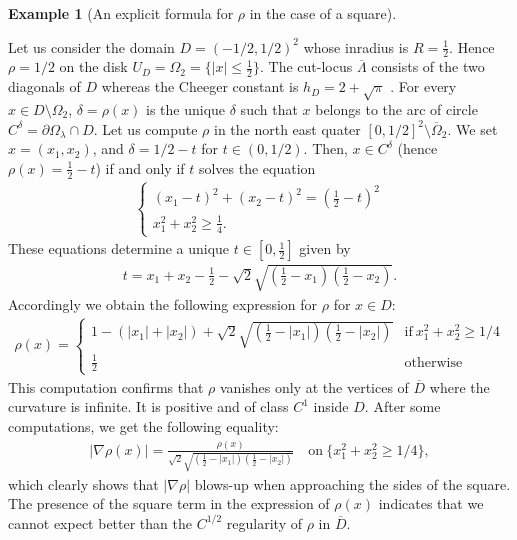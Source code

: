 \documentclass[reqno,11pt]{amsart}
\theoremstyle{definition}
\newtheorem{example}[theorem]{Example}
\numberwithin{equation}{section}
\def\ov{\overline}
\newcommand{\1}{{{\bf 1}\kern-0,28em\rm l}}
\def\O{\Omega}
\def\l{\lambda}
\begin{document}
\begin{example}[An explicit formula for $\rho$ in the case of a square] \label{ExRho}~

Let us consider the domain  $D=(-1/2,1/2)^2$ whose inradius is $R=\frac1{2}$. Hence   $\rho= 1/2$ on the disk $U_D=\Omega_2= \{|x|\le \frac1{2}\}$. 
The cut-locus $\ov{\Lambda}$ consists of the two diagonals of $D$ whereas the Cheeger constant is  $h_D=2+\sqrt{\pi}$ . For every $x\in D\setminus\Omega_2$, $\delta=\rho(x)$ is the unique  $\delta$ such that $x$ belongs to the arc of circle  $C^\delta= \partial \O_\l\cap D$.
Let us compute $\rho$ in the north east quater $[0, 1/2]^2\setminus\ov \Omega_2$. We set $x=(x_1,x_2)$, and $\delta=1/2-t$ for $t\in (0,1/2)$. Then, $x\in C^\delta$ (hence $\rho(x) =\frac1{2}-t$)  if and only if $t$ solves the equation
\begin{align*}
\begin{cases}
(x_1-t)^2 + (x_2-t)^2 = (\frac{1}{2} -t )^2\\
x_1^2 + x_2^2 \ge \frac{1}{4}.
\end{cases}
\end{align*}
These equations determine a unique $t\in [0,\frac1{2}]$  given by
\begin{align*}
t = x_1 +x_2 -\frac{1}{2} - \sqrt{2}\sqrt{\left(\frac{1}{2} - x_1 \right) \left( \frac{1}{2}- x_2 \right)}.
\end{align*}
Accordingly we obtain the following expression for $\rho$ for $x\in D$: 
 \begin{align*}
\rho(x)= \begin{cases}  1 - (|x_1| + |x_2|) + \sqrt{2}\sqrt{\left(\frac{1}{2} - |x_1| \right) \left( \frac{1}{2}- |x_2| \right)} &  \text{if}\  x_1^2+ x_2^2\ge 1/4 \\
\frac1{2}  & \text{otherwise}
\end{cases}
\end{align*}
This computation confirms that $\rho$ vanishes only at the vertices of $\ov D$ where the curvature is infinite. It is positive  and  of class $C^1$  inside $D$. After some computations, we get the following equality:
\begin{align*}
|\nabla\rho(x)| = \frac{\rho(x)}{\sqrt{2}\sqrt{\left(\frac{1}{2} - |x_1| \right) \left( \frac{1}{2}- |x_2| \right)}}
\quad \text{on}\  \{x_1^2+ x_2^2\ge 1/4\} ,
\end{align*}
which clearly shows that $|\nabla \rho|$ blows-up when approaching  the sides of the square.  The presence of the square term in the expression of $\rho(x)$ indicates that we cannot expect better than the $C^{1/2}$ regularity of $\rho$ in $\ov D$. 

\end{example}
\end{document}

